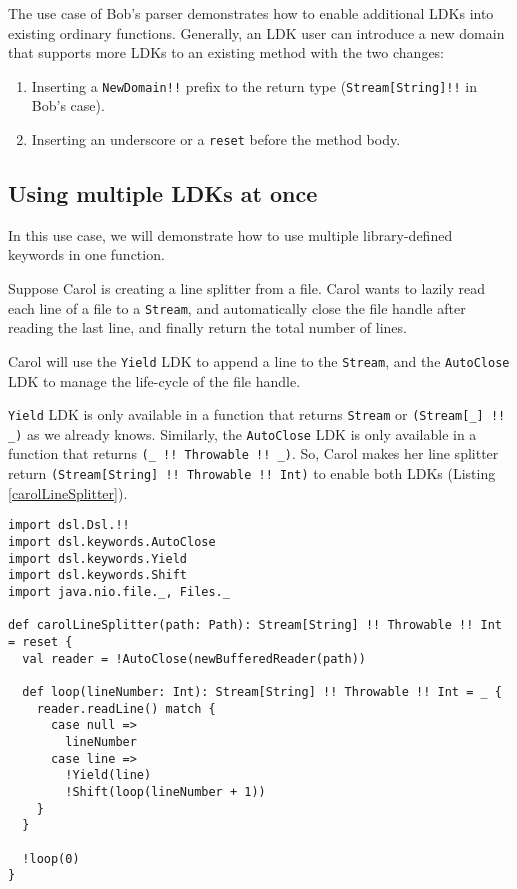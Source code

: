 The use case of Bob's parser demonstrates how to enable additional LDKs into existing ordinary functions. Generally, an LDK user can introduce a new domain that supports more LDKs to an existing method with the two changes:

\begin{enumerate}
  \item Inserting a \lstinline{NewDomain!!} prefix to the return type (\lstinline{Stream[String]!!} in Bob's case).
  \item Inserting an underscore or a \lstinline{reset} before the method body.
\end{enumerate}

\subsection{Using multiple LDKs at once}\label{Using multiple LDKs at once}

In this use case, we will demonstrate how to use multiple library-defined keywords in one function.

Suppose Carol is creating a line splitter from a file. Carol wants to lazily read each line of a file to a \lstinline{Stream}, and automatically close the file handle after reading the last line, and finally return the total number of lines.

Carol will use the \lstinline{Yield} LDK to append a line to the \lstinline{Stream}, and the \lstinline{AutoClose} LDK to manage the life-cycle of the file handle.

\lstinline{Yield} LDK is only available in a function that returns \lstinline{Stream} or \lstinline{(Stream[_] !! _)} as we already knows. Similarly, the \lstinline{AutoClose} LDK is only available in a function that returns \lstinline{(_ !! Throwable !! _)}. So, Carol makes her line splitter return \lstinline{(Stream[String] !! Throwable !! Int)} to enable both LDKs (Listing \ref{carolLineSplitter}).

\begin{lstlisting}[caption={Carol's line splitter},label={carolLineSplitter}]
import dsl.Dsl.!!
import dsl.keywords.AutoClose
import dsl.keywords.Yield
import dsl.keywords.Shift
import java.nio.file._, Files._

def carolLineSplitter(path: Path): Stream[String] !! Throwable !! Int = reset {
  val reader = !AutoClose(newBufferedReader(path))

  def loop(lineNumber: Int): Stream[String] !! Throwable !! Int = _ {
    reader.readLine() match {
      case null =>
        lineNumber
      case line =>
        !Yield(line)
        !Shift(loop(lineNumber + 1))
    }
  }

  !loop(0)
}
\end{lstlisting}

